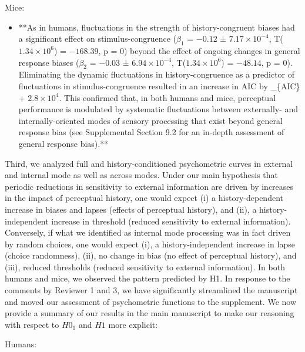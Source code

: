 \documentclass[
]{article}
\providecommand{\tightlist}{%
  \setlength{\itemsep}{0pt}\setlength{\parskip}{0pt}}
\begin{document}
Mice:

\begin{itemize}
\tightlist
\item
  **As in humans, fluctuations in the strength of history-congruent
  biases had a significant effect on stimulus-congruence (\(\beta_1\) =
  \(-0.12\) ± \(\ensuremath{7.17\times 10^{-4}}\),
  T(\(\ensuremath{1.34\times 10^{6}}\)) = \(-168.39\), p = \(0\)) beyond
  the effect of ongoing changes in general response biases (\(\beta_2\)
  = \(-0.03\) ± \(\ensuremath{6.94\times 10^{-4}}\),
  T(\(\ensuremath{1.34\times 10^{6}}\)) = \(-48.14\), p = \(0\)).
  Eliminating the dynamic fluctuations in history-congruence as a
  predictor of fluctuations in stimulus-congruence resulted in an
  increase in AIC by \delta\_\{AIC\} + \ensuremath{2.8\times 10^{4}}.
  This confirmed that, in both humans and mice, perceptual performance
  is modulated by systematic fluctuations between externally- and
  internally-oriented modes of sensory processing that exist beyond
  general response bias (see Supplemental Section 9.2 for an in-depth
  assessment of general response bias).**
\end{itemize}

Third, we analyzed full and history-conditioned psychometric curves in
external and internal mode as well as across modes. Under our main
hypothesis that periodic reductions in sensitivity to external
information are driven by increases in the impact of perceptual history,
one would expect (i) a history-dependent increase in biases and lapses
(effects of perceptual history), and (ii), a history-independent
increase in threshold (reduced sensitivity to external information).
Conversely, if what we identified as internal mode processing was in
fact driven by random choices, one would expect (i), a
history-independent increase in lapse (choice randomness), (ii), no
change in bias (no effect of perceptual history), and (iii), reduced
thresholds (reduced sensitivity to external information). In both humans
and mice, we observed the pattern predicted by H1. In response to the
comments by Reviewer 1 and 3, we have significantly streamlined the
manuscript and moved our assessment of psychometric functions to the
supplement. We now provide a summary of our results in the main
manuscript to make our reasoning with respect to \(H0_1\) and \(H1\)
more explicit:

Humans:
\end{document}

